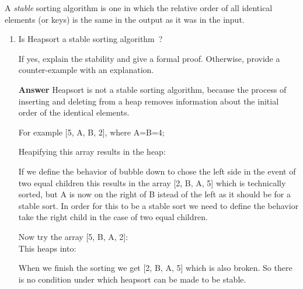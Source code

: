 \documentclass[12pt]{article}
\begin{document}
A \emph{stable} sorting algorithm is one in which the relative order of all
identical elements (or keys) is the same in the output as it was in the input.
\begin{enumerate}
  \item Is Heapsort a stable sorting algorithm~?

  If yes, explain the stability and give a formal proof. Otherwise, provide a
  counter-example with an explanation.

  \textbf{Answer} Heapsort is not a stable sorting algorithm, because the process of inserting and deleting from a heap removes information about the initial order of the identical elements.

  For example [5, A, B, 2], where A=B=4;

  Heapifying this array results in the heap:
  \begin{center}\end{center}

If we define the behavior of bubble down to chose the left side in the event of two equal children this results in the array [2, B, A, 5] which is technically sorted, but A is now on the right of B istead of the left as it should be for a stable sort. In order for this to be a stable sort we need to define the behavior take the right child in the case of two equal children.

Now try the array [5, B, A, 2]:\\
This heaps into:
  \begin{center}\end{center}

When we finish the sorting we get [2, B, A, 5] which is also broken. So there is no condition under which heapsort can be made to be stable.



\end{enumerate}
\end{document}
